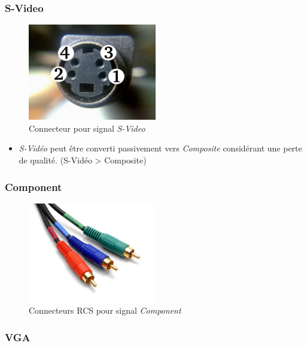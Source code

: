 \documentclass[
  french,
]{book}
\providecommand{\tightlist}{%
  \setlength{\itemsep}{0pt}\setlength{\parskip}{0pt}}
\begin{document}
\hypertarget{s-video}{%
\subsubsection{S-Video}\label{s-video}}

\begin{figure}
\centering
\includegraphics[width=0.5\textwidth,height=\textheight]{medias/lexique/signaux/analogue/svideo.jpg}
\caption{Connecteur pour signal \emph{S-Video}}
\end{figure}

\begin{itemize}
\tightlist
\item
  \emph{S-Vidéo} peut être converti passivement vers \emph{Composite} considérant une perte de qualité. (S-Vidéo \textgreater{} Composite)
\end{itemize}

\hypertarget{component}{%
\subsubsection{Component}\label{component}}

\begin{figure}
\centering
\includegraphics[width=0.5\textwidth,height=\textheight]{medias/lexique/signaux/analogue/component.jpg}
\caption{Connecteurs RCS pour signal \emph{Component}}
\end{figure}

\hypertarget{vga}{%
\subsubsection{VGA}\label{vga}}
\end{document}
